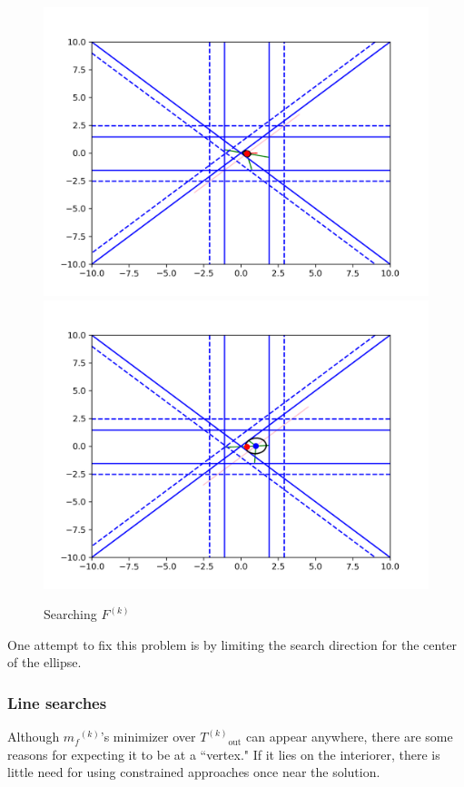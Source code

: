 \documentclass{article}
\theoremstyle{case}
\newcommand{\modelk}{{{m}_f}^{(k)}}
\newcommand{\outertrk}{{T^{(k)}}_{\text{out}}}
\newcommand{\feasiblek}{{F}^{(k)}}
\begin{document}
\begin{figure}[h]
    \centering
    \includegraphics[scale=0.4]{images/everything_runs_1.png}
    \includegraphics[scale=0.4]{images/everything_runs_2.png}
    \caption{Searching $\feasiblek$}
    \label{ellipse_runs_away}
\end{figure}


One attempt to fix this problem is by limiting the search direction for the center of the ellipse.


\subsubsection{Line searches}
Although $\modelk$'s minimizer over $\outertrk$  can appear anywhere, there are some reasons for expecting it to be at a ``vertex."
If it lies on the interiorer, there is little need for using constrained approaches once near the solution.
\end{document}
